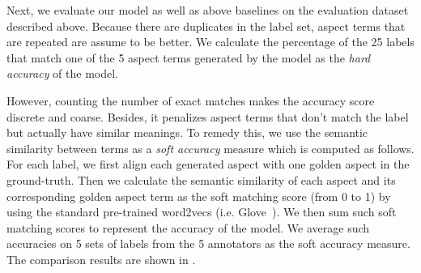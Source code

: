 Next, we evaluate our model as well as above baselines on the evaluation dataset described above. Because there are duplicates in the label set, aspect terms
that are repeated are assume to be better.
We calculate the percentage of the 25 labels that 
match one of the 5 aspect terms generated by the model 
as the \textit{hard accuracy} 
of the model. 

However, counting the number of exact matches 
makes the accuracy score discrete and coarse. 
Besides, it penalizes aspect terms that don't match the label
but actually have similar meanings.
To remedy this, we use the semantic similarity between
terms as a \emph{soft accuracy}  measure which is
computed as follows.
For each label, we first align each generated aspect with 
one golden aspect in the ground-truth.
Then we calculate the semantic similarity
of each aspect and its corresponding golden aspect term as 
the soft matching score (from 0 to 1) by using the standard 
pre-trained word2vecs (i.e. Glove~).
We then sum such soft matching scores to represent the accuracy of 
the model. We average such accuracies on 5 sets of labels from the 5
annotators as the soft accuracy measure. The comparison results are shown 
in . 


